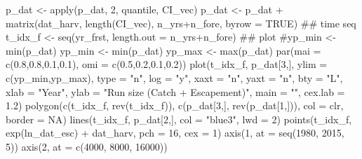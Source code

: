 \documentclass[
  11pt,
]{article}
\newenvironment{Shaded}{}{}
\newcommand{\CommentTok}[1]{\textcolor[rgb]{0.00,0.50,0.00}{#1}}
\newcommand{\DataTypeTok}[1]{#1}
\newcommand{\DecValTok}[1]{#1}
\newcommand{\FloatTok}[1]{#1}
\newcommand{\KeywordTok}[1]{\textcolor[rgb]{0.00,0.00,1.00}{#1}}
\newcommand{\NormalTok}[1]{#1}
\newcommand{\OperatorTok}[1]{#1}
\newcommand{\OtherTok}[1]{\textcolor[rgb]{1.00,0.25,0.00}{#1}}
\newcommand{\StringTok}[1]{\textcolor[rgb]{0.00,0.50,0.50}{#1}}
\begin{document}
\begin{Shaded}
\begin{Highlighting}[]
\NormalTok{p_dat <-}\StringTok{ }\KeywordTok{apply}\NormalTok{(p_dat, }\DecValTok{2}\NormalTok{, quantile, CI_vec)}
\NormalTok{p_dat <-}\StringTok{ }\NormalTok{p_dat }\OperatorTok{+}\StringTok{ }\KeywordTok{matrix}\NormalTok{(dat_harv, }\KeywordTok{length}\NormalTok{(CI_vec), n_yrs}\OperatorTok{+}\NormalTok{n_fore, }\DataTypeTok{byrow =} \OtherTok{TRUE}\NormalTok{)}
\CommentTok{## time seq}
\NormalTok{t_idx_f <-}\StringTok{ }\KeywordTok{seq}\NormalTok{(yr_frst, }\DataTypeTok{length.out =}\NormalTok{ n_yrs}\OperatorTok{+}\NormalTok{n_fore)}
\CommentTok{## plot}
\CommentTok{#yp_min <- min(p_dat)}
\NormalTok{yp_min <-}\StringTok{ }\KeywordTok{min}\NormalTok{(p_dat)}
\NormalTok{yp_max <-}\StringTok{ }\KeywordTok{max}\NormalTok{(p_dat)}
\KeywordTok{par}\NormalTok{(}\DataTypeTok{mai =} \KeywordTok{c}\NormalTok{(}\FloatTok{0.8}\NormalTok{,}\FloatTok{0.8}\NormalTok{,}\FloatTok{0.1}\NormalTok{,}\FloatTok{0.1}\NormalTok{), }\DataTypeTok{omi =} \KeywordTok{c}\NormalTok{(}\FloatTok{0.5}\NormalTok{,}\FloatTok{0.2}\NormalTok{,}\FloatTok{0.1}\NormalTok{,}\FloatTok{0.2}\NormalTok{))}
\KeywordTok{plot}\NormalTok{(t_idx_f, p_dat[}\DecValTok{3}\NormalTok{,], }\DataTypeTok{ylim =} \KeywordTok{c}\NormalTok{(yp_min,yp_max), }\DataTypeTok{type =} \StringTok{"n"}\NormalTok{,}
     \DataTypeTok{log =} \StringTok{"y"}\NormalTok{, }\DataTypeTok{xaxt =} \StringTok{"n"}\NormalTok{, }\DataTypeTok{yaxt =} \StringTok{"n"}\NormalTok{, }\DataTypeTok{bty =} \StringTok{"L"}\NormalTok{,}
     \DataTypeTok{xlab =} \StringTok{"Year"}\NormalTok{, }\DataTypeTok{ylab =} \StringTok{"Run size (Catch + Escapement)"}\NormalTok{, }\DataTypeTok{main =} \StringTok{""}\NormalTok{, }\DataTypeTok{cex.lab =} \FloatTok{1.2}\NormalTok{)}
\KeywordTok{polygon}\NormalTok{(}\KeywordTok{c}\NormalTok{(t_idx_f, }\KeywordTok{rev}\NormalTok{(t_idx_f)), }\KeywordTok{c}\NormalTok{(p_dat[}\DecValTok{3}\NormalTok{,], }\KeywordTok{rev}\NormalTok{(p_dat[}\DecValTok{1}\NormalTok{,])),}
        \DataTypeTok{col =}\NormalTok{ clr, }\DataTypeTok{border =} \OtherTok{NA}\NormalTok{)}
\KeywordTok{lines}\NormalTok{(t_idx_f, p_dat[}\DecValTok{2}\NormalTok{,], }\DataTypeTok{col =} \StringTok{"blue3"}\NormalTok{, }\DataTypeTok{lwd =} \DecValTok{2}\NormalTok{)}
\KeywordTok{points}\NormalTok{(t_idx_f, }\KeywordTok{exp}\NormalTok{(ln_dat_esc) }\OperatorTok{+}\StringTok{ }\NormalTok{dat_harv, }\DataTypeTok{pch =} \DecValTok{16}\NormalTok{, }\DataTypeTok{cex =} \DecValTok{1}\NormalTok{)}
\KeywordTok{axis}\NormalTok{(}\DecValTok{1}\NormalTok{, }\DataTypeTok{at =} \KeywordTok{seq}\NormalTok{(}\DecValTok{1980}\NormalTok{, }\DecValTok{2015}\NormalTok{, }\DecValTok{5}\NormalTok{))}
\KeywordTok{axis}\NormalTok{(}\DecValTok{2}\NormalTok{, }\DataTypeTok{at =} \KeywordTok{c}\NormalTok{(}\DecValTok{4000}\NormalTok{, }\DecValTok{8000}\NormalTok{, }\DecValTok{16000}\NormalTok{))}
\end{Highlighting}
\end{Shaded}
\end{document}
